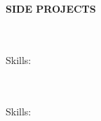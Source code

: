 


\vspace{\spaceSection}
\begin{center}
    \textbf{SIDE PROJECTS}
\end{center}
\vspace{\spaceSection}

\textbf{\sideProjA} \hfill \sideProjADate \\
\sideProjAFor \\
Skills: \sideProjASkills
\vspace{\spaceItems}

\textbf{\sideProjB} \hfill \sideProjBDate \\
\sideProjBFor \\
Skills: \sideProjBSkills
\vspace{\spaceItems}


